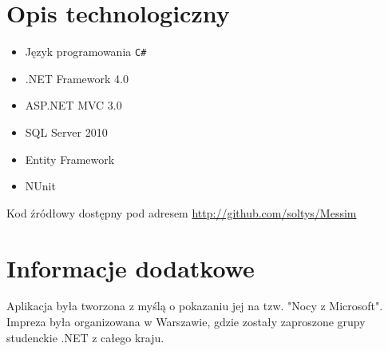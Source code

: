 \documentclass{article}
\begin{document}
\section{Opis technologiczny}
\begin{itemize}
\item Język programowania \texttt{C\#}
\item .NET Framework 4.0
\item ASP.NET MVC 3.0
\item SQL Server 2010
\item Entity Framework
\item NUnit
\end{itemize}

Kod źródłowy dostępny pod adresem \url{http://github.com/soltys/Messim}
\section{Informacje dodatkowe}
Aplikacja była tworzona z myślą o pokazaniu jej na tzw. "Nocy z Microsoft". Impreza była organizowana w Warszawie, gdzie zostały zaproszone grupy studenckie .NET z całego kraju.
\end{document}
